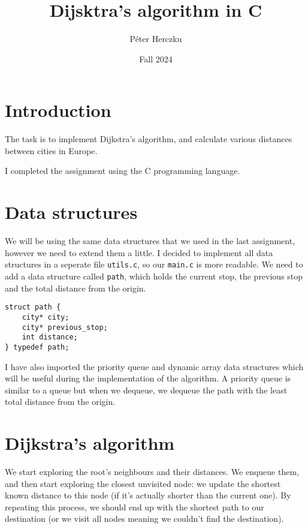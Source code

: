 \documentclass[a4paper,11pt]{article}
\begin{document}
    \title{
        \textbf{Dijsktra's algorithm in C}
    }
    \author{Péter Herczku}
    \date{Fall 2024}

    \maketitle

    \section*{Introduction}

    The task is to implement Dijkstra's algorithm, and calculate various distances between cities in Europe.

    I completed the assignment using the C programming language.

    \section*{Data structures}

    We will be using the same data structures that we used in the last assignment, however we need to extend them a little.
    I decided to implement all data structures in a seperate file {\tt utils.c}, so our {\tt main.c} is more readable.
    We need to add a data structure called {\tt path}, which holds the current stop, the previous stop and the total distance from the origin.

    \begin{verbatim}
struct path {
    city* city;
    city* previous_stop;
    int distance;
} typedef path;
    \end{verbatim}

    I have also imported the priority queue and dynamic array data structures which will be useful during the implementation of the algorithm.
    A priority queue is similar to a queue but when we dequeue, we dequeue the path with the least total distance from the origin.

    \section*{Dijkstra's algorithm}

    We start exploring the root's neighbours and their distances.
    We enqueue them, and then start exploring the closest unvisited node: we update the shortest known distance to this node (if it's actually shorter than the current one).
    By repeating this process, we should end up with the shortest path to our destination (or we visit all nodes meaning we couldn't find the destination).
\end{document}
